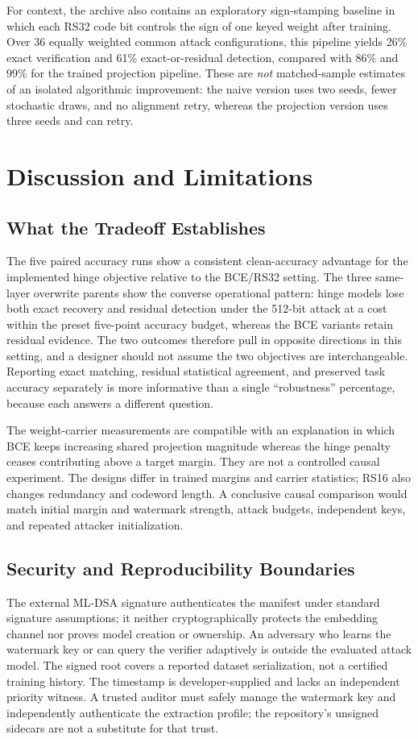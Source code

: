 \documentclass[conference]{IEEEtran}
\begin{document}
For context, the archive also contains an exploratory sign-stamping baseline
in which each RS32 code bit controls the sign of one keyed weight after
training. Over 36 equally weighted common attack configurations, this
pipeline yields 26\% exact verification and 61\% exact-or-residual detection,
compared with 86\% and 99\% for the trained projection pipeline. These are
\emph{not} matched-sample estimates of an isolated algorithmic improvement:
the naive version uses two seeds, fewer stochastic draws, and no alignment
retry, whereas the projection version uses three seeds and can retry.

\section{Discussion and Limitations}
\label{sec:discussion}
\subsection{What the Tradeoff Establishes}
The five paired accuracy runs show a consistent clean-accuracy advantage for
the implemented hinge objective relative to the BCE/RS32 setting. The three
same-layer overwrite parents show the converse operational pattern: hinge
models lose both exact recovery and residual detection under the 512-bit
attack at a cost within the preset five-point accuracy budget, whereas the BCE
variants retain residual evidence. The two outcomes therefore pull in opposite
directions in this setting, and a designer should not assume the two objectives
are interchangeable. Reporting exact matching, residual statistical agreement,
and preserved task accuracy separately is more informative than a single
``robustness'' percentage, because each answers a different question.

The weight-carrier measurements are compatible with an explanation in which
BCE keeps increasing shared projection magnitude whereas the hinge penalty
ceases contributing above a target margin. They are not a controlled causal
experiment. The designs differ in trained margins and carrier statistics;
RS16 also changes redundancy and codeword length. A conclusive causal
comparison would match initial margin and watermark strength, attack budgets,
independent keys, and repeated attacker initialization.

\subsection{Security and Reproducibility Boundaries}
The external ML-DSA signature authenticates the manifest under standard
signature assumptions; it neither cryptographically protects the embedding
channel nor proves model creation or ownership. An adversary who learns the
watermark key or can query the verifier adaptively is outside the evaluated
attack model. The signed root covers a reported dataset serialization, not a
certified training history. The timestamp is developer-supplied and lacks an
independent priority witness. A trusted auditor must safely manage the
watermark key and independently authenticate the extraction profile; the
repository's unsigned sidecars are not a substitute for that trust.
\end{document}
